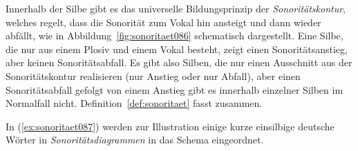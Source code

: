 Innerhalb der Silbe gibt es das universelle Bildungsprinzip der \textit{Sonoritätskontur}, welches regelt, dass die Sonorität zum Vokal hin ansteigt und dann wieder abfällt, wie in Abbildung~\ref{fig:sonoritaet086} schematisch dargestellt.
Eine Silbe, die nur aus einem Plosiv und einem Vokal besteht, zeigt einen Sonoritätsanstieg, aber keinen Sonoritätsabfall.
Es gibt also Silben, die nur einen Ausschnitt aus der Sonoritätskontur realisieren (nur Anstieg oder nur Abfall), aber einen Sonoritätsabfall gefolgt von einem Anstieg gibt es innerhalb einzelner Silben im Normalfall nicht.
Definition~\ref{def:sonoritaet} fasst zusammen.


In (\ref{ex:sonoritaet087}) werden zur Illustration einige kurze einsilbige deutsche Wörter in \textit{Sonoritätsdiagrammen} in das Schema eingeordnet.

\Stretch[0.5]

